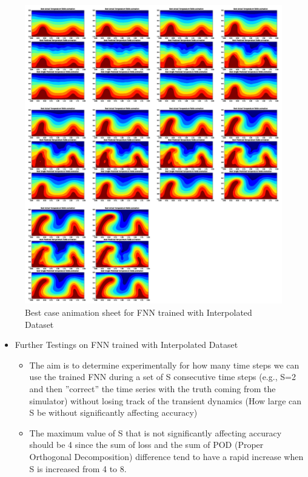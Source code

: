 {\begin{figure}[H]
    \includegraphics[width=\linewidth]{figures/FNN_animation_sheet.png}
    \caption{Best case animation sheet for FNN trained with Interpolated Dataset}
\end{figure}

\begin{itemize}
    \item Further Testings on FNN trained with Interpolated Dataset
        \begin{itemize}
            \item The aim is to determine experimentally for how many time steps we can use the trained FNN during a set of S consecutive time steps (e.g., S=2 and then ”correct” the time series with the truth coming from the simulator) without losing track of the transient dynamics (How large can S be without significantly affecting accuracy)

            \item The maximum value of S that is not significantly affecting accuracy should be 4 since the sum of loss and the sum of POD (Proper Orthogonal Decomposition) difference tend to have a rapid increase when S is increased from 4 to 8.
        \end{itemize}          
\end{itemize}

}
